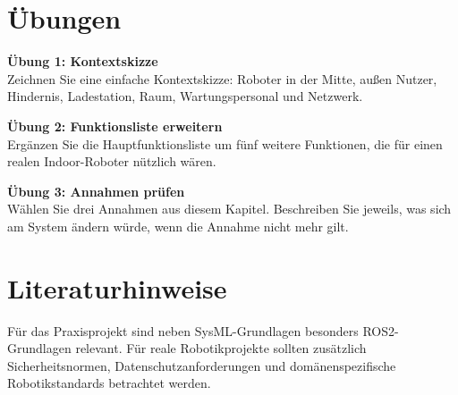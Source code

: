 \section{Übungen}
\begin{uebungbox}
\textbf{Übung 1: Kontextskizze}\\
Zeichnen Sie eine einfache Kontextskizze: Roboter in der Mitte, außen Nutzer, Hindernis, Ladestation, Raum, Wartungspersonal und Netzwerk.
\end{uebungbox}

\begin{uebungbox}
\textbf{Übung 2: Funktionsliste erweitern}\\
Ergänzen Sie die Hauptfunktionsliste um fünf weitere Funktionen, die für einen realen Indoor-Roboter nützlich wären.
\end{uebungbox}

\begin{uebungbox}
\textbf{Übung 3: Annahmen prüfen}\\
Wählen Sie drei Annahmen aus diesem Kapitel. Beschreiben Sie jeweils, was sich am System ändern würde, wenn die Annahme nicht mehr gilt.
\end{uebungbox}

\section{Literaturhinweise}
Für das Praxisprojekt sind neben SysML-Grundlagen \cite{delligatti2014,friedenthal2014} besonders ROS2-Grundlagen \cite{ros2docs} relevant. Für reale Robotikprojekte sollten zusätzlich Sicherheitsnormen, Datenschutzanforderungen und domänenspezifische Robotikstandards betrachtet werden.
